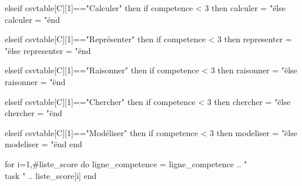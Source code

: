 \documentclass{article}
\begin{document}
\begin{luacode*}
{                        elseif csvtable[C][1]=="Calculer" then
                            if competence < 3 then
                                calculer = "\"
                            else
                                calculer = "\"
                            end
    
                        elseif csvtable[C][1]=="Représenter" then
                            if competence < 3 then
                                representer = "\"
                            else
                                representer = "\"
                            end
                       
                        elseif csvtable[C][1]=="Raisonner" then
                            if competence < 3 then
                                raisonner = "\"
                            else
                                raisonner = "\"
                            end
    
                        elseif csvtable[C][1]=="Chercher" then
                            if competence < 3 then
                                chercher = "\"
                            else
                                chercher = "\"
                            end
    
                        elseif csvtable[C][1]=="Modéliser" then
                            if competence < 3 then
                                modeliser = "\"
                            else
                                modeliser = "\"
                            end
                        end
                    
                        for i=1,#liste_score do
                        ligne_competence = ligne_competence .. "\\task " .. liste_score[i]
                        end
    
}
\end{luacode*}
\end{document}
